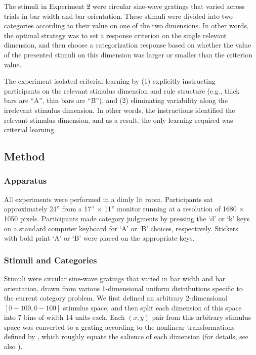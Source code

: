 \documentclass[doc, floatsintext]{apa7}
\providecommand{\DIFadd}[1]{{\protect\color{blue}\uwave{#1}}} %
\providecommand{\DIFdel}[1]{{\protect\color{red}\sout{#1}}}                      %
\providecommand{\DIFaddbegin}{} %
\providecommand{\DIFaddend}{} %
\providecommand{\DIFdelbegin}{} %
\providecommand{\DIFdelend}{} %
\newcommand{\DIFscaledelfig}{0.5}
\newlength{\DIFdelgraphicswidth} %
\newlength{\DIFdelgraphicsheight} %
\newcommand{\DIFaddincludegraphics}[2][]{{\color{blue}\fbox{\DIFOincludegraphics[#1]{#2}}}} %
\newcommand{\DIFdelincludegraphics}[2][]{%
\sbox{\DIFdelgraphicsbox}{\DIFOincludegraphics[#1]{#2}}%
\settoboxwidth{\DIFdelgraphicswidth}{\DIFdelgraphicsbox} %
\settoboxtotalheight{\DIFdelgraphicsheight}{\DIFdelgraphicsbox} %
\scalebox{\DIFscaledelfig}{%
\parbox[b]{\DIFdelgraphicswidth}{\usebox{\DIFdelgraphicsbox}\\[-\baselineskip] \rule{\DIFdelgraphicswidth}{0em}}\llap{\resizebox{\DIFdelgraphicswidth}{\DIFdelgraphicsheight}{%
\setlength{\unitlength}{\DIFdelgraphicswidth}%
\begin{picture}(1,1)%
\thicklines\linethickness{2pt} %
{\color[rgb]{1,0,0}\put(0,0){\framebox(1,1){}}}%
{\color[rgb]{1,0,0}\put(0,0){\line( 1,1){1}}}%
{\color[rgb]{1,0,0}\put(0,1){\line(1,-1){1}}}%
\end{picture}%
}\hspace*{3pt}}} %
} %
\DeclareRobustCommand{\DIFaddbegin}{\DIFOaddbegin \let\includegraphics\DIFaddincludegraphics} %
\DeclareRobustCommand{\DIFaddend}{\DIFOaddend \let\includegraphics\DIFOincludegraphics} %
\DeclareRobustCommand{\DIFdelbegin}{\DIFOdelbegin \let\includegraphics\DIFdelincludegraphics} %
\DeclareRobustCommand{\DIFdelend}{\DIFOaddend \let\includegraphics\DIFOincludegraphics} %
\begin{document}
The stimuli in Experiment \DIFdelbegin \DIFdel{2 }\DIFdelend \DIFaddbegin \DIFadd{1 }\DIFaddend were circular sine-wave gratings
that varied across trials in bar width and bar orientation.
These stimuli were divided into two categories according to
their value on one of the two dimensions. In other words,
the optimal strategy was to set a response criterion on the
single relevant dimension, and then choose a categorization
response based on whether the value of the presented stimuli
on this dimension was larger or smaller than the criterion
value. 

The experiment isolated criterial learning by (1) explicitly
instructing participants on the relevant stimulus dimension
and rule structure (e.g., thick bars are ``A'', thin bars
are ``B''), and (2) eliminating variability along the
irrelevant stimulus dimension. In other words, the
instructions identified the relevant stimulus dimension, and
as a result, the only learning required was criterial
learning. 

\subsection{Method}

\subsubsection{Apparatus}
All experiments were performed in a dimly lit room.
Participants sat approximately 24'' from a 17'' $\times$
11'' monitor running at a resolution of 1680 $\times$ 1050
pixels. Participants made category judgments by pressing the
`d' or `k' keys on a standard computer keyboard for `A' or
`B' choices, respectively. Stickers with bold print `A' or
`B' were placed on the appropriate keys.

\subsubsection{Stimuli and Categories}
Stimuli were circular sine-wave gratings that varied in bar
width and bar orientation, drawn from various 1-dimensional
uniform distributions specific to the current category
problem. We first defined an arbitrary 2-dimensional
$[0-100,0-100]$ stimulus space, and then split each
dimension of this space into 7 bins of width 14 units each.
Each $(x,y)$ pair from this arbitrary stimulus space was
converted to a grating according to the nonlinear
transformations defined by
\textcite{treutwein1989perceptual}, which roughly equate the
salience of each dimension (for details, see also
\textcite{CrossleyAshby2015}).
\end{document}
